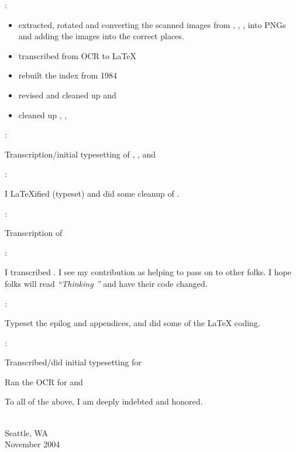 \begin{interview*}
:
\begin{tfquot}
\begin{itemize}
\item extracted, rotated and converting the scanned images from
  , , ,  into PNGs and adding the
  images into the correct places.
  
\item transcribed  from OCR to \LaTeX{}

\item rebuilt the index from 1984

\item revised and cleaned up  and 

\item cleaned up , , 
\end{itemize}
\end{tfquot}
\end{interview*}
\begin{interview}
:
\begin{tfquot}
Transcription/initial typesetting of , , and 
\end{tfquot}
\end{interview}
\begin{interview*}
:
\begin{tfquot}
I \LaTeX{}ified (typeset) and did some cleanup of .
\end{tfquot}
\end{interview*}
\begin{interview*}
:
\begin{tfquot}
Transcription of 
\end{tfquot}
\end{interview*}
\begin{interview*}
:
\begin{tfquot}
I transcribed . I see my contribution as helping to pass on
\Forth{} to other folks.  I hope folks will read \emph{``Thinking
\Forth{}''} and have their code changed.
\end{tfquot}
\end{interview*}
\begin{interview*}
:
\begin{tfquot}
Typeset the epilog and appendices, and did some of the \LaTeX{} coding.
\end{tfquot}
\end{interview*}
\begin{interview*}
:
\begin{tfquot}
Transcribed/did initial typesetting for 
\end{tfquot}
\end{interview*}
\begin{interview*}
\begin{tfquot}
Ran the OCR for  and 
\end{tfquot}
\end{interview*}
To all of the above, I am deeply indebted and honored.

\begin{flushright}
    \\
   Seattle, WA \\
   November 2004
\end{flushright}

